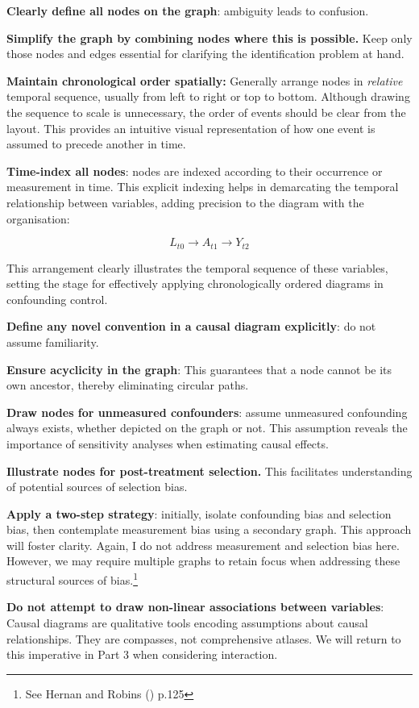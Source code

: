\documentclass[
  singlecolumn,
  9pt]{article}
\begin{document}
\textbf{Clearly define all nodes on the graph}: ambiguity leads to
confusion.

\textbf{Simplify the graph by combining nodes where this is possible.}
Keep only those nodes and edges essential for clarifying the
identification problem at hand.

\textbf{Maintain chronological order spatially:} Generally arrange nodes
in \emph{relative} temporal sequence, usually from left to right or top
to bottom. Although drawing the sequence to scale is unnecessary, the
order of events should be clear from the layout. This provides an
intuitive visual representation of how one event is assumed to precede
another in time.

\textbf{Time-index all nodes}: nodes are indexed according to their
occurrence or measurement in time. This explicit indexing helps in
demarcating the temporal relationship between variables, adding
precision to the diagram with the organisation:

\[L_{t0} \to A_{t1} \to Y_{t2}\]

This arrangement clearly illustrates the temporal sequence of these
variables, setting the stage for effectively applying chronologically
ordered diagrams in confounding control.

\textbf{Define any novel convention in a causal diagram explicitly}: do
not assume familiarity.

\textbf{Ensure acyclicity in the graph}: This guarantees that a node
cannot be its own ancestor, thereby eliminating circular paths.

\textbf{Draw nodes for unmeasured confounders}: assume unmeasured
confounding always exists, whether depicted on the graph or not. This
assumption reveals the importance of sensitivity analyses when
estimating causal effects.

\textbf{Illustrate nodes for post-treatment selection.} This facilitates
understanding of potential sources of selection bias.

\textbf{Apply a two-step strategy}: initially, isolate confounding bias
and selection bias, then contemplate measurement bias using a secondary
graph. This approach will foster clarity. Again, I do not address
measurement and selection bias here. However, we may require multiple
graphs to retain focus when addressing these structural sources of
bias.\footnote{See Hernan and Robins ()
  p.125}

\textbf{Do not attempt to draw non-linear associations between
variables}: Causal diagrams are qualitative tools encoding assumptions
about causal relationships. They are compasses, not comprehensive
atlases. We will return to this imperative in Part 3 when considering
interaction.
\end{document}
